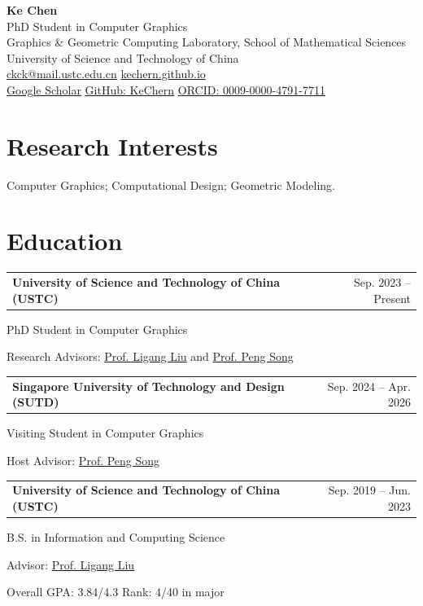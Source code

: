 \documentclass[a4paper,11pt]{article}
\makeatletter
\newcommand{\cvheading}[2]{%
  \begin{tabularx}{\linewidth}{@{}X@{\hspace{1em}}r@{}}
    \textbf{#1} & #2
  \end{tabularx}\par
}
\newcommand{\cventry}[4]{%
  \Needspace{4\baselineskip}%
  \cvheading{#1}{#2}%
  #3\par
  #4\par
}
\newcommand{\entrygap}{\vspace{4pt}}
\makeatother
\begin{document}
\begin{center}
  {\fontsize{28}{32}\selectfont\textbf{Ke Chen}}\\[4pt]
  PhD Student in Computer Graphics\\[3pt]
  Graphics \& Geometric Computing Laboratory, School of Mathematical Sciences\\
  University of Science and Technology of China\\[5pt]
  \href{mailto:ckck@mail.ustc.edu.cn}{ckck@mail.ustc.edu.cn}
  \enspace\textbar\enspace
  \href{https://kechern.github.io/}{kechern.github.io}\\[3pt]
  \href{https://scholar.google.com/citations?user=Hbkn6vkAAAAJ&hl=en}{Google Scholar}
  \enspace\textbar\enspace
  \href{https://github.com/KeChern}{GitHub: KeChern}
  \enspace\textbar\enspace
  \href{https://orcid.org/0009-0000-4791-7711}{ORCID: 0009-0000-4791-7711}
\end{center}

\section{Research Interests}
Computer Graphics; Computational Design; Geometric Modeling.

\section{Education}
\cventry
  {University of Science and Technology of China (USTC)}
  {Sep. 2023 -- Present}
  {PhD Student in Computer Graphics}
  {Research Advisors: \href{http://staff.ustc.edu.cn/~lgliu/}{Prof. Ligang Liu} and \href{https://songpenghit.github.io/}{Prof. Peng Song}}
\entrygap

\cventry
  {Singapore University of Technology and Design (SUTD)}
  {Sep. 2024 -- Apr. 2026}
  {Visiting Student in Computer Graphics}
  {Host Advisor: \href{https://songpenghit.github.io/}{Prof. Peng Song}}
\entrygap

\cvheading{University of Science and Technology of China (USTC)}{Sep. 2019 -- Jun. 2023}
B.S. in Information and Computing Science\par
Advisor: \href{http://staff.ustc.edu.cn/~lgliu/}{Prof. Ligang Liu}\par
Overall GPA: 3.84/4.3 \enspace\textperiodcentered\enspace Rank: 4/40 in major
\end{document}

